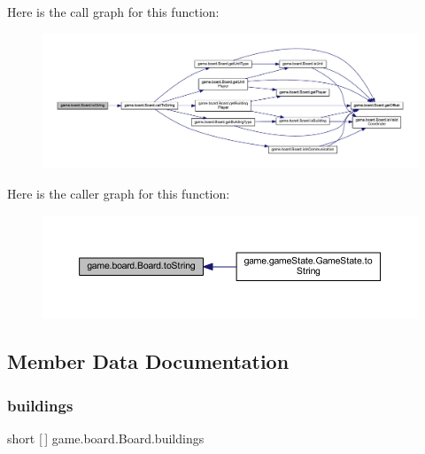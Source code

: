 Here is the call graph for this function\+:
\nopagebreak
\begin{figure}[H]
\begin{center}
\leavevmode
\includegraphics[width=350pt]{classgame_1_1board_1_1_board_aef2fb3bb74281bbc59a9f2f7c1603141_cgraph}
\end{center}
\end{figure}
Here is the caller graph for this function\+:
\nopagebreak
\begin{figure}[H]
\begin{center}
\leavevmode
\includegraphics[width=350pt]{classgame_1_1board_1_1_board_aef2fb3bb74281bbc59a9f2f7c1603141_icgraph}
\end{center}
\end{figure}


\subsection{Member Data Documentation}
\mbox{\label{classgame_1_1board_1_1_board_a80c3765beb7554e91aabbd09784f6632}} 
\subsubsection{\texorpdfstring{buildings}{buildings}}
{\footnotesize\ttfamily short \mbox{[}$\,$\mbox{]} game.\+board.\+Board.\+buildings\hspace{0.3cm}{\ttfamily [private]}}

\mbox{\label{classgame_1_1board_1_1_board_a8131ce8576efce30d08ab999fa3d88bf}} 
